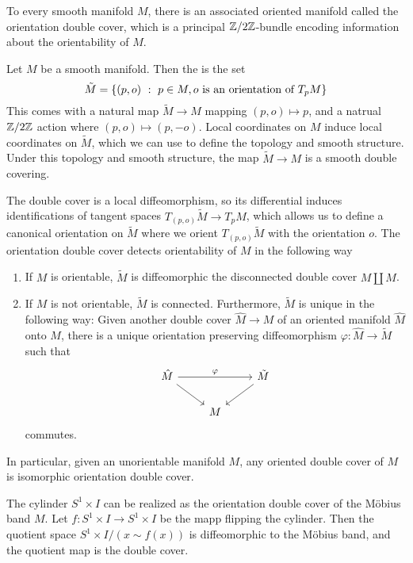 %
To every smooth manifold $M$, there is an associated oriented manifold called the
orientation double cover, which is a principal $\mathbb{Z}/2\mathbb{Z}$-bundle encoding
information about the orientability of $M$.
%
\begin{defn}
Let $M$ be a smooth manifold. Then the  is the set
\[
\tilde{M} = \left\lbrace (p, o) ~:~ p \in M, o \text{ is an orientation of } T_pM \right\rbrace
\]
This comes with a natural map $\tilde{M} \to M$ mapping $(p,o) \mapsto p$,
and a natrual $\mathbb{Z}/2\mathbb{Z}$ action where $(p,o) \mapsto (p,-o)$. Local coordinates
on $M$ induce local coordinates on $\tilde{M}$, which we can use to define the
topology and smooth structure. Under this topology and smooth structure, the
map $\tilde{M} \to M$ is a smooth double covering.
\end{defn}
%
The double cover is a local diffeomorphism, so its differential induces
identifications of tangent spaces $T_{(p,o)}\tilde{M} \to T_pM$, which allows
us to define a canonical orientation on $\tilde{M}$ where we orient
$T_{(p,o)}\tilde{M}$ with the orientation $o$. The orientation double cover
detects orientability of $M$ in the following way
%
\begin{thm} \enumbreak
\begin{enumerate}
  \item If $M$ is orientable, $\tilde{M}$ is diffeomorphic the disconnected
  double cover $M \coprod M$.
  \item If $M$ is not orientable, $\tilde{M}$ is connected. Furthermore,
  $\tilde{M}$ is unique in the following way: Given another double cover
  $\hat{M} \to M$ of an oriented manifold $\hat{M}$ onto $M$, there is a unique
  orientation preserving diffeomorphism $\varphi : \hat{M} \to \tilde{M}$ such
  that
  \[\begin{tikzcd}
  \hat{M} \ar[dr]\ar[rr, "\varphi"] && \tilde{M}\ar[dl] \\
   & M
  \end{tikzcd}\]
  commutes.
\end{enumerate}
\end{thm}
%
In particular, given an unorientable manifold $M$, any oriented double
cover of $M$ is isomorphic orientation double cover.
%
\begin{exmp}
The cylinder $S^1 \times I$ can be realized as the orientation double
cover of the M\"obius band $M$. Let $f : S^1 \times I \to S^1 \times I$ be the
mapp flipping the cylinder. Then the quotient space $S^1 \times I / (x \sim f(x))$
is diffeomorphic to the M\"obius band, and the quotient map is the double cover.
\end{exmp}
